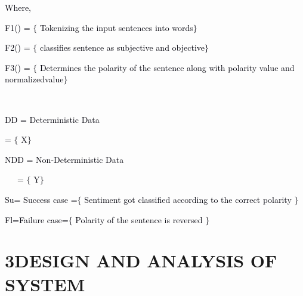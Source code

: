 \documentclass[12pt]{article}
\begin{document}
\textcolor[HTML]{00000A}{Where,}\par

\textcolor[HTML]{00000A}{F1() = $ \{ $ Tokenizing the input sentences into words$ \} $ }\par

\textcolor[HTML]{00000A}{F2() = $ \{ $ classifies sentence as subjective and objective$ \} $ }\par

\textcolor[HTML]{00000A}{F3() = $ \{ $ Determines the polarity of the sentence along with polarity value and normalized\tab  value$ \} $ }\par

\textcolor[HTML]{00000A}{\ \ \ \ \ \ \ \ \ \ \ \ \ \ \ \ \ \ \ \ \ \ \ \ \ \ \ \ \ \ \ \ \ \ \ \ \ \ \ \ \ \ \ \ \ \ \ \ \ \ \ \ \ \ \ \ \ \ \ \ \ \ \ \ \  \tab }\par

\textcolor[HTML]{00000A}{DD = Deterministic Data}\par

\textcolor[HTML]{00000A}{ \tab  = $ \{ $ X$ \} $ }\par

\textcolor[HTML]{00000A}{NDD = Non-Deterministic Data}\par

\textcolor[HTML]{00000A}{ \tab \ \ \  = $ \{ $ Y$ \} $ }\par

\textcolor[HTML]{00000A}{Su= Success case =$ \{ $  Sentiment got classified according to the correct polarity $ \} $ }\par

\textcolor[HTML]{00000A}{Fl=Failure case=$ \{ $  Polarity of the sentence is reversed $ \} $ }\par

\begin{justify}
{\fontsize{15pt}{18.0pt}\selectfont \textbf{ }\par}
\end{justify}\par

\setlength{\parskip}{12.0pt}
\begin{justify}
\textbf{ }
\end{justify}\par

\section*{3\hspace*{10pt}DESIGN AND ANALYSIS OF SYSTEM}
\end{document}
